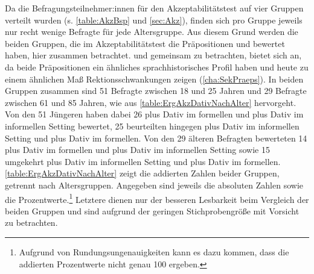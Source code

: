 Da die Befragungsteilnehmer:innen für den Akzeptabilitätstest auf vier Gruppen verteilt wurden (s. \autoref{table:AkzBsp} und \autoref{sec:Akz}), finden sich pro Gruppe jeweils nur recht wenige Befragte für jede Altersgruppe. 
Aus diesem Grund werden die beiden Gruppen, die im Akzeptabilitätstest die Präpositionen \wegen{} und \waehrend{} bewertet haben, hier zusammen betrachtet. 
 und \waehrend{} gemeinsam zu betrachten, bietet sich an, da beide Präpositionen ein ähnliches sprachhistorisches Profil haben und heute zu einem ähnlichen Maß Rektionsschwankungen zeigen (\autoref{cha:SekPraeps}). 
In beiden Gruppen zusammen sind 51 Befragte zwischen 18 und 25 Jahren und 29 Befragte zwischen 61 und 85 Jahren, wie aus \autoref{table:ErgAkzDativNachAlter} hervorgeht. 
Von den 51 Jüngeren haben dabei 26 \wegen{} plus Dativ im formellen und \waehrend{} plus Dativ im informellen Setting bewertet, 25 beurteilten hingegen \wegen{} plus Dativ im informellen Setting und \waehrend{} plus Dativ im formellen. 
Von den 29 älteren Befragten bewerteten 14 \wegen{} plus Dativ im formellen und \waehrend{} plus Dativ im informellen Setting sowie 15 umgekehrt \wegen{} plus Dativ im informellen Setting und \waehrend{} plus Dativ im formellen.
\autoref{table:ErgAkzDativNachAlter} zeigt die addierten Zahlen beider Gruppen, getrennt nach Altersgruppen. 
Angegeben sind jeweils die absoluten Zahlen sowie die Prozentwerte.\footnote{Aufgrund von Rundungsungenauigkeiten kann es dazu kommen, dass die addierten Prozentwerte nicht genau 100 ergeben.}
Letztere dienen nur der besseren Lesbarkeit beim Vergleich der beiden Gruppen und sind aufgrund der geringen Stichprobengröße mit Vorsicht zu betrachten. 
\largerpage

